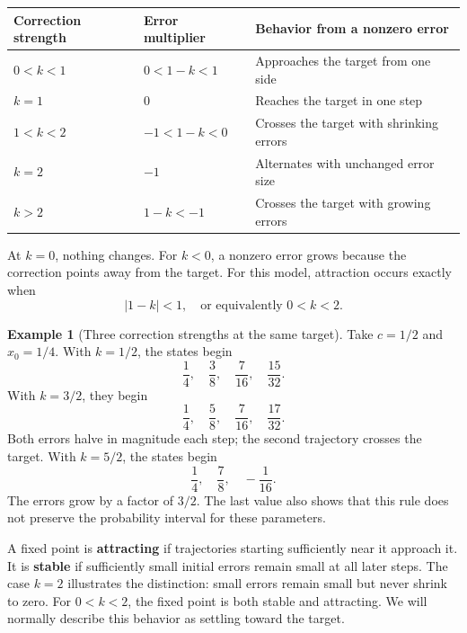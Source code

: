 \documentclass[11pt,oneside,openany]{book}
\theoremstyle{definition}
\newtheorem{example}{Example}[chapter]
\theoremstyle{remark}
\numberwithin{equation}{chapter}
\begin{document}
\begin{longtable}[]{@{}
  >{\raggedright\arraybackslash}p{}
  >{\raggedright\arraybackslash}p{}
  >{\raggedright\arraybackslash}p{}@{}}
\toprule\noalign{}
\begin{minipage}[b]{\linewidth}\raggedright
Correction strength
\end{minipage} & \begin{minipage}[b]{\linewidth}\raggedright
Error multiplier
\end{minipage} & \begin{minipage}[b]{\linewidth}\raggedright
Behavior from a nonzero error
\end{minipage} \\
\midrule\noalign{}
\endhead
\bottomrule\noalign{}
\endlastfoot
\(0<k<1\) & \(0<1-k<1\) & Approaches the target from one side \\
\(k=1\) & \(0\) & Reaches the target in one step \\
\(1<k<2\) & \(-1<1-k<0\) & Crosses the target with shrinking errors \\
\(k=2\) & \(-1\) & Alternates with unchanged error size \\
\(k>2\) & \(1-k<-1\) & Crosses the target with growing errors \\
\end{longtable}

At \(k=0\), nothing changes. For \(k<0\), a nonzero error grows because the correction points away from the target. For this model, attraction occurs exactly when \[\boxed{|1-k|<1,\quad\text{or equivalently }0<k<2.}\]

\begin{example}[Three correction strengths at the same target]

Take \(c=1/2\) and \(x_0=1/4\). With \(k=1/2\), the states begin \[\frac14,\quad\frac38,\quad\frac7{16},\quad\frac{15}{32}.\] With \(k=3/2\), they begin \[\frac14,\quad\frac58,\quad\frac7{16},\quad\frac{17}{32}.\] Both errors halve in magnitude each step; the second trajectory crosses the target. With \(k=5/2\), the states begin \[\frac14,\quad\frac78,\quad-\frac1{16}.\] The errors grow by a factor of \(3/2\). The last value also shows that this rule does not preserve the probability interval for these parameters.

\end{example}

A fixed point is \textbf{attracting} if trajectories starting sufficiently near it approach it. It is \textbf{stable} if sufficiently small initial errors remain small at all later steps. The case \(k=2\) illustrates the distinction: small errors remain small but never shrink to zero. For \(0<k<2\), the fixed point is both stable and attracting. We will normally describe this behavior as settling toward the target.
\end{document}
